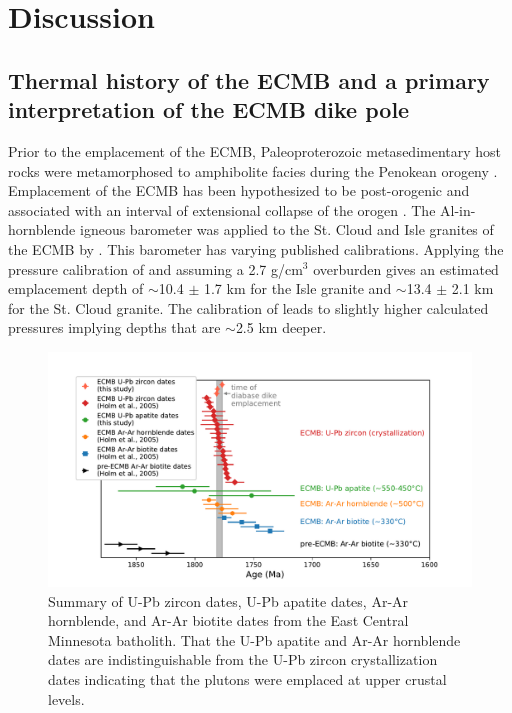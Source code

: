\documentclass[draft]{agujournal2019}
\begin{document}
\section*{Discussion}

\subsection*{Thermal history of the ECMB and a primary interpretation of the ECMB dike pole}

Prior to the emplacement of the ECMB, Paleoproterozoic metasedimentary host rocks were metamorphosed to amphibolite facies during the Penokean orogeny \cite{Holm1990a}. Emplacement of the ECMB has been hypothesized to be post-orogenic and associated with an interval of extensional collapse of the orogen \cite{Holm1998a, Boerboom2000a}. The Al-in-hornblende igneous barometer was applied to the St. Cloud and Isle granites of the ECMB by \cite{Holm1998a}. This barometer has varying published calibrations. Applying the pressure calibration of \cite{Mutch2016a} and assuming a 2.7 g/cm$^{3}$ overburden gives an estimated emplacement depth of $\sim$10.4 $\pm$ 1.7 km for the Isle granite and $\sim$13.4 $\pm$ 2.1 km for the St. Cloud granite. The calibration of \cite{Ague1997a} leads to slightly higher calculated pressures implying depths that are $\sim$2.5 km deeper. 

\begin{figure}[!ht]
\centering
\noindent\includegraphics[width=\textwidth]{./figures/ECMB_dates_thermochron.pdf}
\caption{\small{Summary of U-Pb zircon dates, U-Pb apatite dates, Ar-Ar hornblende, and Ar-Ar biotite dates from the East Central Minnesota batholith. That the U-Pb apatite and Ar-Ar hornblende dates are indistinguishable from the U-Pb zircon crystallization dates indicating that the plutons were emplaced at upper crustal levels.}}
\label{fig:U_Pb_dates}
\end{figure}
\end{document}
